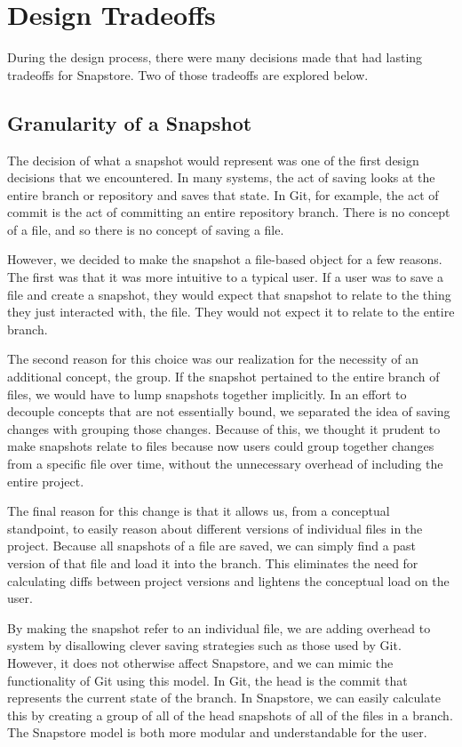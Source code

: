 \section{Design Tradeoffs}

During the design process, there were many decisions made that had lasting tradeoffs for Snapstore. Two of those tradeoffs are explored below.

\subsection{Granularity of a Snapshot}

The decision of what a snapshot would represent was one of the first design decisions that we encountered. In many systems, the act of saving looks at the entire branch or repository and saves that state. In Git, for example, the act of commit is the act of committing an entire repository branch. There is no concept of a file, and so there is no concept of saving a file. 

However, we decided to make the snapshot a file-based object for a few reasons. The first was that it was more intuitive to a typical user. If a user was to save a file and create a snapshot, they would expect that snapshot to relate to the thing they just interacted with, the file. They would not expect it to relate to the entire branch.

The second reason for this choice was our realization for the necessity of an additional concept, the group. If the snapshot pertained to the entire branch of files, we would have to lump snapshots together implicitly. In an effort to decouple concepts that are not essentially bound, we separated the idea of saving changes with grouping those changes. Because of this, we thought it prudent to make snapshots relate to files because now users could group together changes from a specific file over time, without the unnecessary overhead of including the entire project.  

The final reason for this change is that it allows us, from a conceptual standpoint, to easily reason about different versions of individual files in the project. Because all snapshots of a file are saved, we can simply find a past version of that file and load it into the branch. This eliminates the need for calculating diffs between project versions and lightens the conceptual load on the user.

By making the snapshot refer to an individual file, we are adding overhead to system by disallowing clever saving strategies such as those used by Git. However, it does not otherwise affect Snapstore, and we can mimic the functionality of Git using this model. In Git, the head is the commit that represents the current state of the branch. In Snapstore, we can easily calculate this by creating a group of all of the head snapshots of all of the files in a branch. The Snapstore model is both more modular and understandable for the user.

